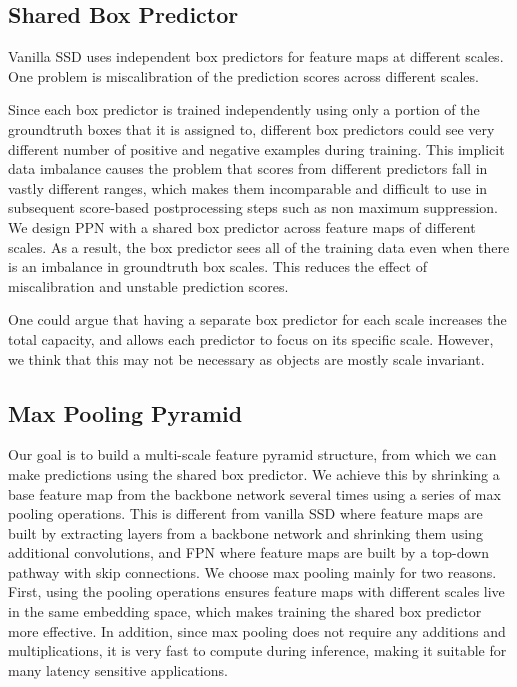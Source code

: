 \documentclass[10pt,twocolumn,letterpaper]{article}
\begin{document}
\subsection{Shared Box Predictor}
Vanilla SSD uses independent box predictors for feature maps at different scales.
One problem is miscalibration of the prediction scores across different scales.

Since each box predictor is trained independently using only
a portion of the groundtruth boxes that it is assigned to,
different box predictors could see very different number of
positive and negative examples during training.  This
implicit data imbalance causes the problem that scores
from different predictors fall in vastly different ranges,
which makes them incomparable and difficult to use in
subsequent score-based postprocessing steps such as non maximum
suppression.  We design PPN with a shared box predictor
across feature maps of different scales.  As a result, the
box predictor sees all of the training data even when
there is an imbalance in groundtruth box scales. This reduces
the effect of miscalibration and unstable prediction scores.

One could argue that having a separate box predictor for each
scale increases the total capacity, and allows each
predictor to focus on its specific scale. However, we think
that this may not be necessary as objects are mostly scale
invariant.


\subsection{Max Pooling Pyramid}

Our goal is to build a multi-scale feature pyramid
structure, from which we can make predictions using the
shared box predictor.  We achieve this by shrinking a
base feature map from the backbone network several times
using a series of max pooling operations.  This is different
from vanilla SSD where feature maps are built by extracting layers
from a backbone network and shrinking them using additional
convolutions, and FPN where feature maps are built by a
top-down pathway with skip connections.  We choose max
pooling mainly for two reasons.  First, using the pooling
operations ensures feature maps with different scales live
in the same embedding space, which makes training the shared
box predictor more effective.  In addition, since max
pooling does not require any additions and multiplications,
it is very fast to compute during inference,
making it suitable for many latency sensitive applications.
\end{document}

